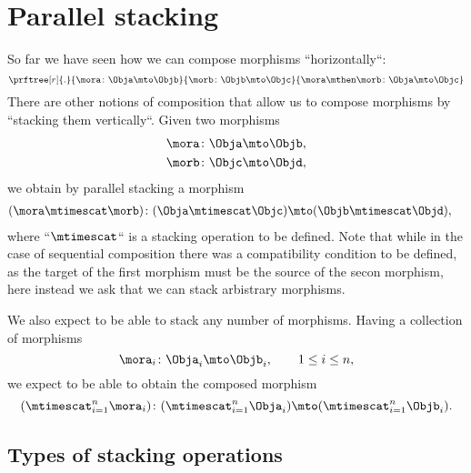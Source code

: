 \section{Parallel stacking}

So far we have seen how we can compose morphisms ``horizontally``:
%
\begin{equation}
    \prftree[r]{.
    }{
        \mora \colon \Obja \mto \Objb
    }{
        \morb\colon \Objb \mto \Objc
    }{
        \mora \mthen \morb \colon \Obja \mto \Objc
    }
\end{equation}
%
There are other notions of composition that allow us to compose morphisms by ``stacking them vertically``.
Given two morphisms
%
\begin{align}
    \mora & \colon \Obja \mto \Objb, \\
    \morb & \colon \Objc \mto \Objd,
\end{align}
%
we obtain by parallel stacking a morphism
%
\begin{align}
    (\mora\mtimescat \morb)
     & \colon (\Obja \mtimescat \Objc) \mto (\Objb \mtimescat \Objd),
\end{align}
%
where ``$\mtimescat$`` is a stacking operation to be defined.
Note that while in the case of sequential composition there was a compatibility condition to be defined, as the target of the first morphism must be the source of the secon morphism, here instead we ask that we can stack arbistrary morphisms.

We also expect to be able to stack any number of morphisms.
Having a collection of morphisms
%
\begin{equation}
    \mora_i \colon \Obja_i \mto \Objb_i, \qquad 1 \leq i \leq n,
\end{equation}
%
we expect to be able to obtain the composed morphism
%
\begin{equation}
    (\mtimescat_{i=1}^n  \mora_i )
    \colon( \mtimescat_{i=1}^n  \Obja_i )\mto (\mtimescat_{i=1}^n  \Objb_i).
\end{equation}

\subsection{Types of stacking operations}

